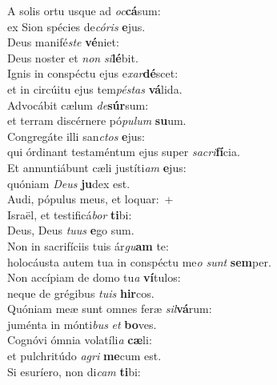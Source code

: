 \evenverse A solis ortu usque ad \textit{oc}\textbf{cá}sum:~\*\\
\evenverse ex Sion spécies de\textit{có}\textit{ris} \textbf{e}jus.\\
\oddverse Deus manifé\textit{ste} \textbf{vé}niet:~\*\\
\oddverse Deus noster et \textit{non} \textit{si}\textbf{lé}bit.\\
\evenverse Ignis in conspéctu ejus e\textit{xar}\textbf{dé}scet:~\*\\
\evenverse et in circúitu ejus tem\textit{pé}\textit{stas} \textbf{vá}lida.\\
\oddverse Advocábit cælum \textit{de}\textbf{súr}sum:~\*\\
\oddverse et terram discérnere pó\textit{pu}\textit{lum} \textbf{su}um.\\
\evenverse Congregáte illi san\textit{ctos} \textbf{e}jus:~\*\\
\evenverse qui órdinant testaméntum ejus super \textit{sa}\textit{cri}\textbf{fí}cia.\\
\oddverse Et annuntiábunt cæli justíti\textit{am} \textbf{e}jus:~\*\\
\oddverse quóniam \textit{De}\textit{us} \textbf{ju}dex est.\\
\evenverse Audi, pópulus meus, et loquar:~+\\
\evenverse  Israël, et testificá\textit{bor} \textbf{ti}bi:~\*\\
\evenverse Deus, Deus \textit{tu}\textit{us} \textbf{e}go sum.\\
\oddverse Non in sacrifíciis tuis ár\textit{gu}\textbf{am} te:~\*\\
\oddverse holocáusta autem tua in conspéctu me\textit{o} \textit{sunt} \textbf{sem}per.\\
\evenverse Non accípiam de domo tu\textit{a} \textbf{ví}tulos:~\*\\
\evenverse neque de grégibus \textit{tu}\textit{is} \textbf{hir}cos.\\
\oddverse Quóniam meæ sunt omnes feræ \textit{sil}\textbf{vá}rum:~\*\\
\oddverse juménta in mónti\textit{bus} \textit{et} \textbf{bo}ves.\\
\evenverse Cognóvi ómnia volatíli\textit{a} \textbf{cæ}li:~\*\\
\evenverse et pulchritúdo \textit{a}\textit{gri} \textbf{me}cum est.\\
\oddverse Si esuríero, non di\textit{cam} \textbf{ti}bi:~\*\\

